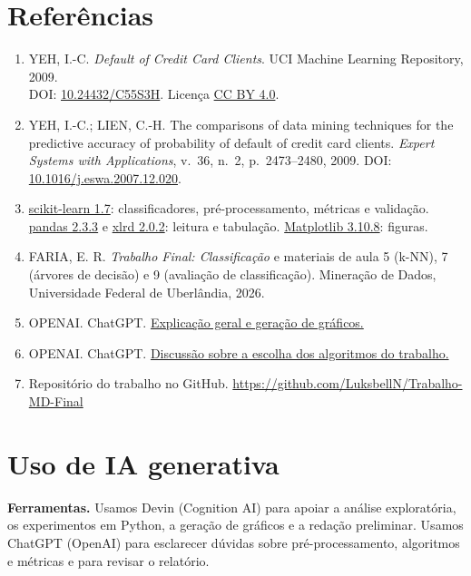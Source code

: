 \documentclass[11pt,a4paper]{article}
\begin{document}
\section{Referências}
\begingroup\small
\begin{enumerate}
  \item YEH, I.-C. \textit{Default of Credit Card Clients}. UCI Machine
  Learning Repository, 2009.\\
  DOI: \href{https://doi.org/10.24432/C55S3H}{10.24432/C55S3H}.
  Licença \href{https://creativecommons.org/licenses/by/4.0/}{CC BY 4.0}.
  \item YEH, I.-C.; LIEN, C.-H. The comparisons of data mining techniques for the predictive
  accuracy of probability of default of credit card clients. \textit{Expert Systems with
  Applications}, v.~36, n.~2, p.~2473--2480, 2009.
  DOI: \href{https://doi.org/10.1016/j.eswa.2007.12.020}{10.1016/j.eswa.2007.12.020}.
  \item \href{https://scikit-learn.org/1.7/}{scikit-learn 1.7}: classificadores, pré-processamento,
  métricas e validação. \href{https://pandas.pydata.org/docs/}{pandas 2.3.3} e
  \href{https://xlrd.readthedocs.io/}{xlrd 2.0.2}: leitura e tabulação.
  \href{https://matplotlib.org/stable/}{Matplotlib 3.10.8}: figuras.
  \item FARIA, E. R. \textit{Trabalho Final: Classificação} e materiais de
  aula 5 (k-NN), 7 (árvores de decisão) e 9 (avaliação de classificação).
  Mineração de Dados, Universidade Federal de Uberlândia, 2026.
  \item OPENAI. ChatGPT. \href{https://chatgpt.com/share/6b04da96-4530-83e9-98f6-85088f31c754}{Explicação geral e geração de gráficos.}
  \item OPENAI. ChatGPT. \href{https://chatgpt.com/share/6b04daa8-973c-83e9-92fe-b00af9c01be8}{Discussão sobre a escolha dos algoritmos do trabalho.}
  \item Repositório do trabalho no GitHub. \url{https://github.com/LuksbellN/Trabalho-MD-Final}
\end{enumerate}
\endgroup

\newpage
\section*{Uso de IA generativa}
\textbf{Ferramentas.} Usamos Devin (Cognition AI) para apoiar a análise
exploratória, os experimentos em Python, a geração de gráficos e a redação
preliminar. Usamos ChatGPT (OpenAI) para esclarecer dúvidas sobre
pré-processamento, algoritmos e métricas e para revisar o relatório.
\end{document}
